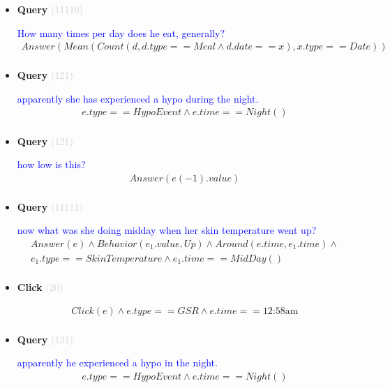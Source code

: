 \documentclass[11pt]{article}
\newcommand{\key}[1]{\textcolor{lightgray}{#1}}
\newcounter{CQuery}
\newcounter{CClick}
\begin{document}
\begin{itemize}
\item
\textbf{Query\theCQuery} \key{(11110)} \addtocounter{CQuery}{1}
\textcolor{blue}{ How many times per day does he eat, generally? }
\begin{multline*}
Answer(Mean(Count(d, d.type==Meal \wedge d.date==x), x.type==Date)) \\ 
\end{multline*}


\item
\textbf{Query\theCQuery} \key{(121)} \addtocounter{CQuery}{1}
\textcolor{blue}{ apparently she has experienced a hypo during the night. }
\begin{multline*}
e.type==HypoEvent \wedge e.time==Night() \\ 
\end{multline*}


\item
\textbf{Query\theCQuery} \key{(121)} \addtocounter{CQuery}{1}
\textcolor{blue}{ how low is this? }
\begin{multline*}
Answer(e(-1).value) \\ 
\end{multline*}


\item
\textbf{Query\theCQuery} \key{(11111)} \addtocounter{CQuery}{1}
\textcolor{blue}{ now what was she doing midday when her skin temperature went up? }
\begin{multline*}
Answer(e) \wedge Behavior(e_1.value, Up) \wedge Around(e.time, e_1.time) \wedge \\ 
e_1.type==SkinTemperature \wedge e_1.time==MidDay() \\ 
\end{multline*}


\item
\textbf{Click\theCClick} \key{(20)} \addtocounter{CClick}{1}
\textcolor{blue}{  }
\begin{multline*}
Click(e) \wedge e.type==GSR \wedge e.time==\mbox{12:58am} \\ 
\end{multline*}


\item
\textbf{Query\theCQuery} \key{(121)} \addtocounter{CQuery}{1}
\textcolor{blue}{ apparently he experienced a hypo in the night. }
\begin{multline*}
e.type==HypoEvent \wedge e.time==Night() \\ 
\end{multline*}



\end{itemize}
\end{document}
